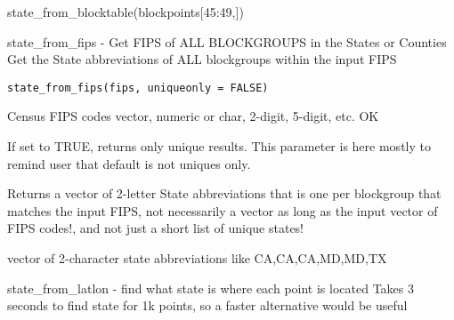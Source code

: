 \documentclass[a4paper]{book}
\begin{document}
%
\begin{Examples}
\begin{ExampleCode}
state_from_blocktable(blockpoints[45:49,])
\end{ExampleCode}
\end{Examples}
%
\begin{Description}\relax
state\_from\_fips - Get FIPS of ALL BLOCKGROUPS in the States or Counties
Get the State abbreviations of ALL blockgroups within the input FIPS
\end{Description}
%
\begin{Usage}
\begin{verbatim}
state_from_fips(fips, uniqueonly = FALSE)
\end{verbatim}
\end{Usage}
%
\begin{Arguments}
\begin{ldescription}
\item[\code{fips}] Census FIPS codes vector, numeric or char, 2-digit, 5-digit, etc. OK

\item[\code{uniqueonly}] If set to TRUE, returns only unique results.
This parameter is here mostly to remind user that default is not uniques only.
\end{ldescription}
\end{Arguments}
%
\begin{Details}\relax
Returns a vector of 2-letter State abbreviations that is
one per blockgroup that matches the input FIPS,
not necessarily a vector as long as the input vector of FIPS codes!,
and not just a short list of unique states!
\end{Details}
%
\begin{Value}
vector of 2-character state abbreviations like CA,CA,CA,MD,MD,TX
\end{Value}
%
\begin{Description}\relax
state\_from\_latlon - find what state is where each point is located
Takes 3 seconds to find state for 1k points, so a faster alternative would be useful
\end{Description}
\end{document}
